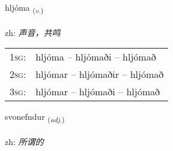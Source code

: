 \documentclass[frontgrid, backgrid]{flacards}\usepackage[]{graphicx}\usepackage[]{color}
\begin{document}
\renewcommand{\blhead}{\vskip5pt {\small\bfseries\footnotesize Sagnorð | 动词 }}
\renewcommand{\bcfoot}{\vskip5pt \hspace{2pt}{\small\bfseries\footnotesize 2K}}


{hljóma \small{\textsubscript{(\textit{v.})}} \\[1ex] %
\textphonetic{[l̥jouːma]} \\
zh: \emph{声音，共鸣} \\  [2ex]
\renewcommand*{\arraystretch}{0.8}
\begin{tabular}{p{1cm}l}
\textsc{1sg}: & hljóma -- hljómaði -- hljómað \\ 
\textsc{2sg}: & hljómar -- hljómaðir -- hljómað \\ 
\textsc{3sg}: & hljómar -- hljómaði -- hljómað \\ 
\end{tabular}
}

\renewcommand{\flhead}{\vskip5pt \fboxsep=0pt {\small\bfseries\footnotesize Lýsingarorð | 形容词}}
\renewcommand{\fcfoot}{\vskip5pt \fboxsep=0pt \hspace{2pt}{\small\bfseries\footnotesize 2K}}

\renewcommand{\blhead}{\vskip5pt {\small\bfseries\footnotesize Lýsingarorð | 形容词 }}
\renewcommand{\bcfoot}{\vskip5pt \hspace{2pt}{\small\bfseries\footnotesize 2K}}


{svonefndur \small{\textsubscript{(\textit{adj.})}} \\[1ex] %
\textphonetic{[svɔnɛmtʏr]} \\
zh: \emph{所谓的} \\  [2ex]
\renewcommand*{\arraystretch}{0.8}
}
\end{document}
